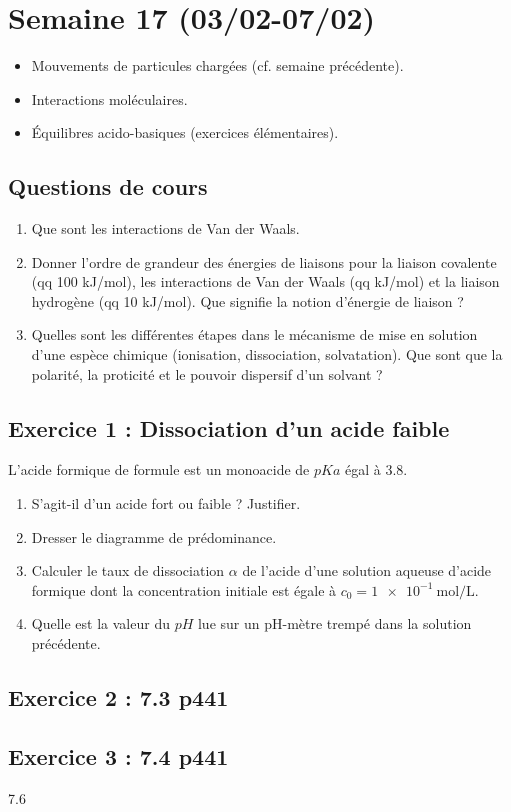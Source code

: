 \section{Semaine 17 (03/02-07/02) }


\begin{itemize}
	\item Mouvements de particules chargées (cf. semaine précédente).
	\item Interactions moléculaires.
	\item Équilibres acido-basiques (exercices élémentaires).
\end{itemize}

\subsection{Questions de cours}

\begin{enumerate}
	\item Que sont les interactions de Van der Waals.
	\item Donner l'ordre de grandeur des énergies de liaisons pour la liaison covalente (qq 100 kJ/mol), les interactions de Van der Waals (qq kJ/mol) et la liaison hydrogène (qq 10 kJ/mol). Que signifie la notion d'énergie de liaison ?
	\item Quelles sont les différentes étapes dans le mécanisme de mise en solution d'une espèce chimique (ionisation, dissociation, solvatation). Que sont que la polarité, la proticité et le pouvoir dispersif d'un solvant ? 
\end{enumerate}

\subsection{Exercice 1 : Dissociation d'un acide faible}

L'acide formique de formule  est un monoacide de $pKa$ égal à $3.8$.

\begin{enumerate}
	\item S'agit-il d'un acide fort ou faible ? Justifier.
	\item Dresser le diagramme de prédominance.
	\item Calculer le taux de dissociation $\alpha$ de l'acide d'une solution aqueuse d'acide formique dont la concentration initiale est égale à $c_0 = \SI{1e-1}{\mol\per\liter}$.
	\item Quelle est la valeur du $pH$ lue sur un pH-mètre trempé dans la solution précédente.
\end{enumerate}

\subsection{Exercice 2 : 7.3 p441}

\subsection{Exercice 3 : 7.4 p441}

7.6

